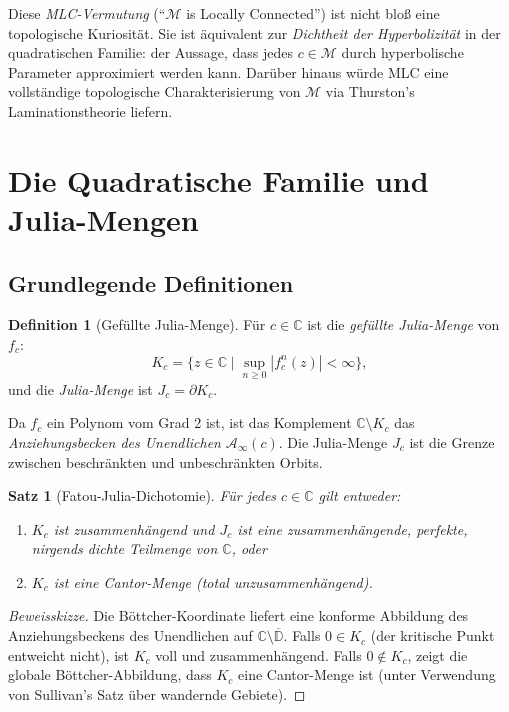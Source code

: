 \documentclass[12pt,a4paper]{amsart}
\newtheorem{satz}[theorem]{Satz}
\theoremstyle{definition}
\newtheorem{definition_de}[theorem]{Definition}
\theoremstyle{remark}
\begin{document}
Diese \emph{MLC-Vermutung} (``$\mathcal{M}$ is Locally Connected'') ist nicht
bloß eine topologische Kuriosität. Sie ist äquivalent zur \emph{Dichtheit der
Hyperbolizität} in der quadratischen Familie: der Aussage, dass jedes
$c \in \mathcal{M}$ durch hyperbolische Parameter approximiert werden kann.
Darüber hinaus würde MLC eine vollständige topologische Charakterisierung
von $\mathcal{M}$ via Thurston's Laminationstheorie liefern.

\section{Die Quadratische Familie und Julia-Mengen}

\subsection{Grundlegende Definitionen}

\begin{definition_de}[Gefüllte Julia-Menge]
Für $c \in \mathbb{C}$ ist die \emph{gefüllte Julia-Menge} von $f_c$:
\[
    K_c = \{ z \in \mathbb{C} \mid \sup_{n \geq 0} |f_c^n(z)| < \infty \},
\]
und die \emph{Julia-Menge} ist $J_c = \partial K_c$.
\end{definition_de}

Da $f_c$ ein Polynom vom Grad 2 ist, ist das Komplement
$\mathbb{C} \setminus K_c$ das \emph{Anziehungsbecken des Unendlichen}
$\mathcal{A}_\infty(c)$. Die Julia-Menge $J_c$ ist die Grenze zwischen
beschränkten und unbeschränkten Orbits.

\begin{satz}[Fatou-Julia-Dichotomie]
Für jedes $c \in \mathbb{C}$ gilt entweder:
\begin{enumerate}[label=\roman*)]
\item $K_c$ ist zusammenhängend und $J_c$ ist eine zusammenhängende,
      perfekte, nirgends dichte Teilmenge von $\mathbb{C}$, oder
\item $K_c$ ist eine Cantor-Menge (total unzusammenhängend).
\end{enumerate}
\end{satz}

\begin{proof}[Beweisskizze]
Die Böttcher-Koordinate liefert eine konforme Abbildung des Anziehungsbeckens
des Unendlichen auf $\mathbb{C} \setminus \overline{\mathbb{D}}$. Falls $0 \in K_c$
(der kritische Punkt entweicht nicht), ist $K_c$ voll und zusammenhängend.
Falls $0 \notin K_c$, zeigt die globale Böttcher-Abbildung, dass $K_c$ eine
Cantor-Menge ist (unter Verwendung von Sullivan's Satz über wandernde Gebiete).
\end{proof}
\end{document}
